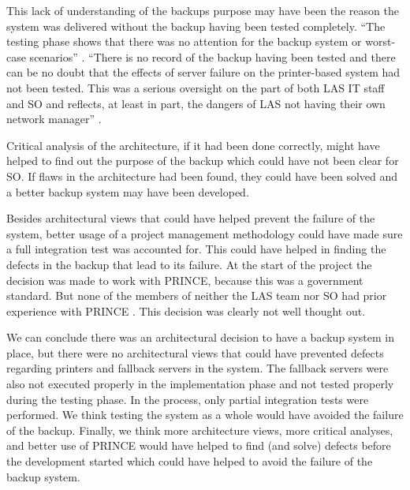 This lack of understanding of the backups purpose may have been the reason the system was delivered without the backup having been tested completely.
``The testing phase shows that there was no attention for the backup system or worst-case scenarios'' \cite[s3085,s3132]{officialreport}.
``There is no record of the backup having been tested and there can be no doubt that the effects of server failure on the printer-based system had not been tested.
This was a serious oversight on the part of both LAS IT staff and SO and reflects, at least in part, the dangers of LAS not having their own network manager'' \cite[s4041]{officialreport}.

Critical analysis of the architecture, if it had been done correctly, might have helped to find out the purpose of the backup which could have not been clear for SO.
If flaws in the architecture had been found, they could have been solved and a better backup system may have been developed.

Besides architectural views that could have helped prevent the failure of the system, better usage of a project management methodology could have made sure a full integration test was accounted for.
This could have helped in finding the defects in the backup that lead to its failure.
At the start of the project the decision was made to work with PRINCE, because this was a government standard.
But none of the members of neither the LAS team nor SO had prior experience with PRINCE \cite[s3068,s3078]{officialreport}.
This decision was clearly not well thought out.

We can conclude there was an architectural decision to have a backup system in place,
but there were no architectural views that could have prevented defects regarding printers and fallback servers in the system.
The fallback servers were also not executed properly in the implementation phase and not tested properly during the testing phase.
In the process, only partial integration tests were performed.
We think testing the system as a whole would have avoided the failure of the backup.
Finally, we think more architecture views, more critical analyses,
and better use of PRINCE would have helped to find (and solve) defects before the development started which could have helped to avoid the failure of the backup system.